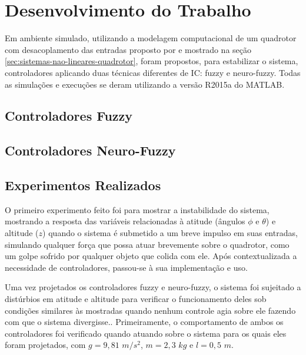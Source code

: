 %
%

\chapter{Desenvolvimento do Trabalho}
\label{chap:desenvolvimento-trabalho}

Em ambiente simulado, utilizando a modelagem computacional de um quadrotor com desacoplamento das entradas proposto por  e mostrado na seção \ref{sec:sistemas-nao-lineares-quadrotor}, foram propostos, para estabilizar o sistema, controladores aplicando duas técnicas diferentes de IC: fuzzy e neuro-fuzzy. Todas as simulações e execuções se deram utilizando a versão R2015a do MATLAB.

\section{Controladores Fuzzy}
\label{sec:controlador-fuzzy}



\section{Controladores Neuro-Fuzzy}
\label{sec:controlador-neuro-fuzzy}



\section{Experimentos Realizados}
\label{sec:experimentos-realizados}

O primeiro experimento feito foi para mostrar a instabilidade do sistema, mostrando a resposta das variáveis relacionadas à atitude (ângulos $\phi$ e $\theta$) e altitude ($z$) quando o sistema é submetido a um breve impulso em suas entradas, simulando qualquer força que possa atuar brevemente sobre o quadrotor, como um golpe sofrido por qualquer objeto que colida com ele. Após contextualizada a necessidade de controladores, passou-se à sua implementação e uso.

Uma vez projetados os controladores fuzzy e neuro-fuzzy, o sistema foi sujeitado a distúrbios em atitude e altitude para verificar o funcionamento deles sob condições similares às mostradas quando nenhum controle agia sobre ele fazendo com que o sistema divergisse.. Primeiramente, o comportamento de ambos os controladores foi verificado quando atuando sobre o sistema para os quais eles foram projetados, com $g=9,81$ $m/s^2$, $m=2,3$ $kg$ e $l=0,5$ $m$. 

